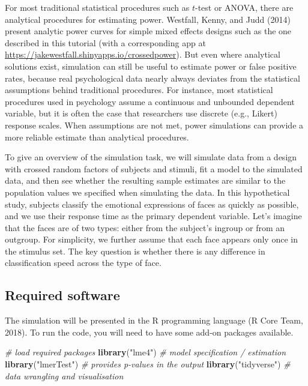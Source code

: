 \documentclass[english,doc,floatsintext]{apa6}
\newenvironment{Shaded}{\begin{snugshade}}{\end{snugshade}}
\newcommand{\CommentTok}[1]{\textcolor[rgb]{0.56,0.35,0.01}{\textit{#1}}}
\newcommand{\KeywordTok}[1]{\textcolor[rgb]{0.13,0.29,0.53}{\textbf{#1}}}
\newcommand{\NormalTok}[1]{#1}
\newcommand{\StringTok}[1]{\textcolor[rgb]{0.31,0.60,0.02}{#1}}
\begin{document}
For most traditional statistical procedures such as \(t\)-test or ANOVA, there are analytical procedures for estimating power. Westfall, Kenny, and Judd (2014) present analytic power curves for simple mixed effects designs such as the one described in this tutorial (with a corresponding app at \url{https://jakewestfall.shinyapps.io/crossedpower}). But even where analytical solutions exist, simulation can still be useful to estimate power or false positive rates, because real psychological data nearly always deviates from the statistical assumptions behind traditional procedures. For instance, most statistical procedures used in psychology assume a continuous and unbounded dependent variable, but it is often the case that researchers use discrete (e.g., Likert) response scales. When assumptions are not met, power simulations can provide a more reliable estimate than analytical procedures.

To give an overview of the simulation task, we will simulate data from a design with crossed random factors of subjects and stimuli, fit a model to the simulated data, and then see whether the resulting sample estimates are similar to the population values we specified when simulating the data. In this hypothetical study, subjects classify the emotional expressions of faces as quickly as possible, and we use their response time as the primary dependent variable. Let's imagine that the faces are of two types: either from the subject's ingroup or from an outgroup. For simplicity, we further assume that each face appears only once in the stimulus set. The key question is whether there is any difference in classification speed across the type of face.

\hypertarget{required-software}{%
\subsection{Required software}\label{required-software}}

The simulation will be presented in the R programming language (R Core Team, 2018). To run the code, you will need to have some add-on packages available.

\begin{Shaded}
\begin{Highlighting}[]
\CommentTok{# load required packages}
\KeywordTok{library}\NormalTok{(}\StringTok{"lme4"}\NormalTok{)        }\CommentTok{# model specification / estimation}
\KeywordTok{library}\NormalTok{(}\StringTok{"lmerTest"}\NormalTok{)    }\CommentTok{# provides p-values in the output}
\KeywordTok{library}\NormalTok{(}\StringTok{"tidyverse"}\NormalTok{)   }\CommentTok{# data wrangling and visualisation}
\end{Highlighting}
\end{Shaded}
\end{document}
